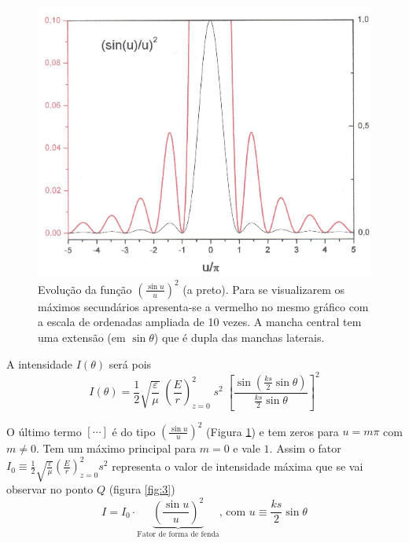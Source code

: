\documentclass[a4paper,12pt]{article}
\begin{document}
\begin{figure}[htb]  \centering 
	\includegraphics[width=0.7
	\textwidth]{figura4.png} \caption{
	Evolução da função $\left( \frac{\sin u}{u} \right)^2 $ (a preto). Para se visualizarem os máximos secundários apresenta-se a vermelho no mesmo gráfico com a escala de ordenadas ampliada de 10 vezes.
A mancha central tem uma extensão (em $\sin \theta$) que é dupla das manchas laterais. \label{fig:4}} 
\end{figure}

A intensidade $I(\theta)$ será pois
\begin{equation}
	\label{eq:31} I(\theta) = \frac{1}{2}\sqrt{\frac{ \varepsilon}{\mu}} \; \left( \frac{E}{r} \right)_{z=0}^2 \; s^2 \; \left[ \frac{ \sin( \frac{k s}{2}\sin \theta)}{ \frac{k s}{2}\sin \theta} \right]^2 
\end{equation}

O último termo $\left[ \cdots \right] $  é do tipo $(\frac{\sin u}{u})^2 $ (Figura \ref{fig:4}) e tem zeros para $u = m \pi$ com $m \neq 0$. Tem um máximo principal para $m = 0$ e vale $1$. Assim o fator $I_0 \equiv \frac{1}{2} \sqrt{\frac{ \varepsilon}{\mu}} (\frac{E}{r })_{z=0}^2 s^2$ representa o valor de intensidade máxima que se vai observar no ponto $Q$ (figura \ref{fig:3})
\begin{equation}
	\label{eq:32} I = I_0 \cdot \underbrace{\left( \frac{\sin u}{u} \right)^2}_\text{Fator de forma de fenda} \text{, com } u\equiv \frac{k s}{2}\sin \theta 
\end{equation}
\end{document}
